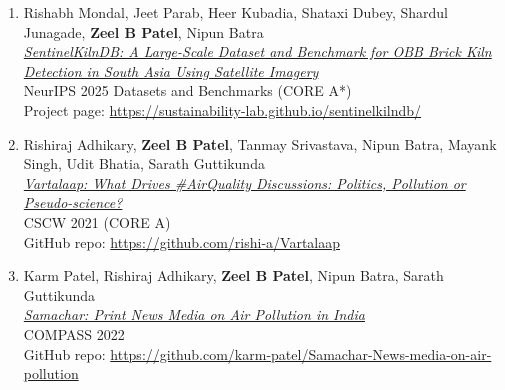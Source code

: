 \documentclass[letter,10pt]{article}
\begin{document}
\begin{itemize}
\begin{enumerate}
    \item{Rishabh Mondal, Jeet Parab, Heer Kubadia, Shataxi Dubey, Shardul Junagade, \textbf{Zeel B Patel}, Nipun Batra}\\
    \href{https://openreview.net/forum?id=efGzsxVSEC}{\textit{SentinelKilnDB: A Large-Scale Dataset and Benchmark for OBB Brick Kiln Detection in South Asia Using Satellite Imagery}}\\
    NeurIPS 2025 Datasets and Benchmarks (CORE A*)\\
    Project page: \href{https://sustainability-lab.github.io/sentinelkilndb/}{https://sustainability-lab.github.io/sentinelkilndb/}
    
    \item{Rishiraj Adhikary, \textbf{Zeel B Patel}, Tanmay Srivastava, Nipun Batra, Mayank Singh, Udit Bhatia, Sarath Guttikunda}\\
    \href{https://dl.acm.org/doi/abs/10.1145/3449170}{\textit{Vartalaap: What Drives \#AirQuality Discussions: Politics, Pollution or Pseudo-science?}}\\
    CSCW 2021 (CORE A)\\
    GitHub repo: \href{https://github.com/rishi-a/Vartalaap}{https://github.com/rishi-a/Vartalaap}
    
    \item{Karm Patel, Rishiraj Adhikary, \textbf{Zeel B Patel}, Nipun Batra, Sarath Guttikunda}\\
    \href{https://dl.acm.org/doi/abs/10.1145/3530190.3534812}{\textit{Samachar: Print News Media on Air Pollution in India}}\\
    COMPASS 2022\\
    GitHub repo: \href{https://github.com/karm-patel/Samachar-News-media-on-air-pollution}{https://github.com/karm-patel/Samachar-News-media-on-air-pollution}\\
    
    
    \end{enumerate}

        

\end{itemize}
\end{document}
